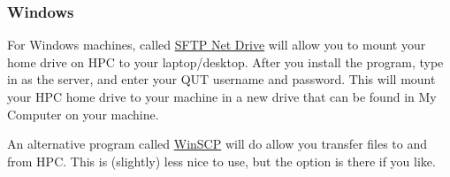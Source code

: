 \subsubsection{Windows}
For Windows machines, called \href{https://www.nsoftware.com/netdrive/sftp/}{SFTP Net Drive} will allow you to mount your home drive on HPC to your laptop/desktop. After you install the program, type in  as the server, and enter your QUT username and password. This will mount your HPC home drive to your machine in a new drive that can be found in My Computer on your machine.
%
\par
%
An alternative program called \href{https://winscp.net/eng/download.php}{WinSCP} will do allow you transfer files to and from HPC. This is (slightly) less nice to use, but the option is there if you like.

